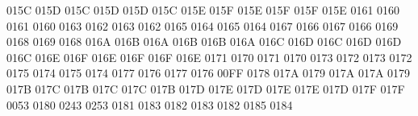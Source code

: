 \setcclcucx 015C 015D 015C %
\setcclcucx 015D 015D 015C %
\setcclcucx 015E 015F 015E %
\setcclcucx 015F 015F 015E %
 0161 0160 %
 0161 0160 %
 0163 0162 %
 0163 0162 %
 0165 0164 %
 0165 0164 %
 0167 0166 %
 0167 0166 %
 0169 0168 %
 0169 0168 %
\setcclcucx 016A 016B 016A %
\setcclcucx 016B 016B 016A %
\setcclcucx 016C 016D 016C %
\setcclcucx 016D 016D 016C %
\setcclcucx 016E 016F 016E %
\setcclcucx 016F 016F 016E %
 0171 0170 %
 0171 0170 %
 0173 0172 %
 0173 0172 %
 0175 0174 %
 0175 0174 %
 0177 0176 %
 0177 0176 %
 00FF 0178 %
 017A 0179 %
\setcclcucx 017A 017A 0179 %
\setcclcucx 017B 017C 017B %
\setcclcucx 017C 017C 017B %
\setcclcucx 017D 017E 017D %
\setcclcucx 017E 017E 017D %
\setcclcucx 017F 017F 0053 %
 0180 0243 %
 0253 0181 %
 0183 0182 %
 0183 0182 %
 0185 0184 %

